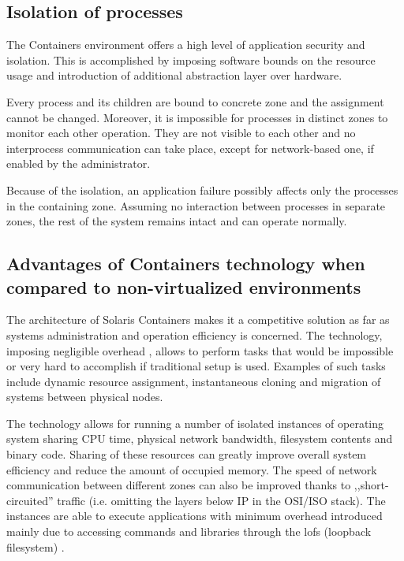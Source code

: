 \documentclass[11pt]{book}
\begin{document}
      \subsection{Isolation of processes}
      \label{sub:}

        The Containers environment offers a high level of application security and isolation. This is accomplished by
        imposing software bounds on the resource usage and introduction of additional abstraction layer over hardware.

        Every process and its children are bound to concrete zone and the assignment cannot be changed. Moreover, it is
        impossible for processes in distinct zones to monitor each other operation. They are not visible to each other
        and no interprocess communication can take place, except for network-based one, if enabled by the administrator.

        Because of the isolation, an application failure possibly affects only the processes in the containing zone.
        Assuming no interaction between processes in separate zones, the rest of the system remains intact and can
        operate normally.
        
      

      \subsection{Advantages of Containers technology when compared to non-virtualized environments}
      \label{sub:}

        The architecture of Solaris Containers makes it a competitive solution as far as systems administration and
        operation efficiency is concerned. The technology, imposing negligible overhead \cite{price}, allows to perform
        tasks that would be impossible or very hard to accomplish if traditional setup is used. Examples of such tasks
        include dynamic resource assignment, instantaneous cloning and migration of systems between physical nodes.

        The technology allows for running a number of isolated instances of operating system sharing CPU time,
        physical network bandwidth, filesystem contents and binary code. Sharing of these resources can greatly improve
        overall system efficiency and reduce the amount of occupied memory. The speed of network communication between
        different zones can also be improved thanks to ,,short-circuited'' traffic (i.e. omitting the layers below IP in
        the OSI/ISO stack). The instances are able to execute applications with minimum overhead introduced mainly due
        to accessing commands and libraries through the lofs (loopback filesystem) \cite{price,fsag}.
\end{document}
